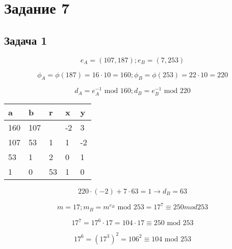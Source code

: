 \documentclass[a4paper,14pt]{article} %
\begin{document}

\section{Задание 7}

\subsection{Задача 1}
\begin{equation*}
	e_A = (107, 187); e_B = (7, 253)
\end{equation*}

\begin{equation*}
	\phi_A = \phi(187) = 16 \cdot 10 = 160; \phi_B = \phi(253) = 22 \cdot  10 = 220
\end{equation*}

\begin{equation*}
	d_A = e_A^{-1} \text{ mod } 160; d_B = e_B^{-1} \text{ mod 220}
\end{equation*}

\begin{table}[H]
	\begin{tabular}{|l|l|l|l|l|}
	\hline
	a   & b   & r  & x  & y  \\ \hline
	160 & 107 &    & -2 & 3  \\ \hline
	107 & 53  & 1  & 1  & -2 \\ \hline
	53  & 1   & 2  & 0  & 1  \\ \hline
	1   & 0   & 53 & 1  & 0  \\ \hline
	\end{tabular}
\end{table}

\begin{equation*}
	220 \cdot (-2) + 7 \cdot 63 = 1 \rightarrow d_B = 63
\end{equation*}

\begin{equation*}
	m = 17; m_B = m^{e_B} \text{ mod } 253 = 17^7 \equiv 250 mod 253
\end{equation*}

\begin{equation*}
	17^7 = 17^6 \cdot 17 = 104 \cdot 17 \equiv 250 \text{ mod } 253
\end{equation*}

\begin{equation*}
	17^6 = (17^3)^2 = 106^2 \equiv 104 \text{ mod } 253
\end{equation*}
\end{document}
